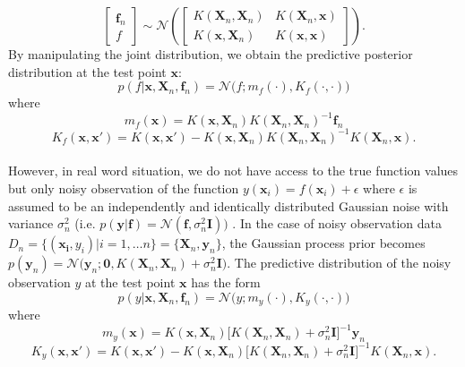 \documentclass[a4paper,11pt]{report}
\begin{document}
\begin{equation}
	\begin{bmatrix}
  		 \mathbf{f}_n\\ 
   		f
	  \end{bmatrix}
		\sim\mathcal{N} \left ( 
 		\begin{bmatrix}
   		K(\mathbf{X}_n,\mathbf{X}_n) & K(\mathbf{X}_n,\mathbf{x}) \\
   		K( \mathbf{x}, \mathbf{X}_n) & K( \mathbf{x}, \mathbf{x})
 	\end{bmatrix} \right ).
 \end{equation} 
By manipulating the joint distribution, we obtain the predictive posterior distribution at the test point $\mathbf{x}$:
\begin{equation} \label{posteriorf}
	p(f \vert \mathbf{x},\mathbf{X}_n, \mathbf{f}_n) = \mathcal{N}\big( f ; m_{f}(\cdot), K_{f}(\cdot, \cdot) \big)
\end{equation}
where 
\begin{equation} 
	m_{f}(\mathbf{x})=K(\mathbf{x}, \mathbf{X}_n) K(\mathbf{X}_n,\mathbf{X}_n)^{-1} \mathbf{f}_n 
\end{equation}
\begin{equation} \label{covarianceofposter}
	K_{f}(\mathbf{x},\mathbf{x}')=  K(\mathbf{x},\mathbf{x}') - K( \mathbf{x},\mathbf{X}_n ) K(\mathbf{X}_n,\mathbf{X}_n)^{-1} K(\mathbf{X}_n,\mathbf{x}).
\end{equation} 
\\
However, in real word situation, we do not have access to the true function values but only noisy observation of the function $ y(\mathbf{x}_i) = f(\mathbf{x}_i) +  \epsilon $ where $\epsilon$ is assumed to be an independently and identically distributed Gaussian noise with variance $\sigma_n^2$ \big(i.e. $p(\mathbf{y} \vert \mathbf{f}) = \mathcal{N} ( \mathbf{f}, \sigma_n^2 \mathbf{I}) \big)$ \cite{rasmussen2006gaussian}.  In the case of noisy observation data $D_n=\{(\mathbf{x_{i}},y_{i}) \vert i=1, \dots n\}=\{ \mathbf{X}_n,\mathbf{y}_n\}$, the Gaussian process prior becomes $p (\mathbf{y}_n)= \mathcal{N}\big(\mathbf{y}_n; \mathbf{0},K( \mathbf{X}_n,\mathbf{X}_n)+\sigma_n^2 \mathbf{I} \big)$. The predictive distribution of the noisy observation $y$ at the test point $\mathbf{x}$ has the form
 	\begin{equation} \label{posteriory}
	p(y \vert \mathbf{x},\mathbf{X}_n, \mathbf{f}_n) =\mathcal{N} \big( y ; m_{y}(\cdot), K_{y}(\cdot, \cdot) \big)
 	\end{equation}
where 
\begin{equation} 
	m_{y}(\mathbf{x})=K(\mathbf{x}, \mathbf{X}_n) \big[ K(\mathbf{X}_n,\mathbf{X}_n) +\sigma_n^2 \mathbf{I} \big]^{-1} \mathbf{y}_n 
\end{equation}
\begin{equation} 
	K_{y}(\mathbf{x},\mathbf{x}')=  K(\mathbf{x},\mathbf{x}') - K(\mathbf{x}, \mathbf{X}_n)\big[ K(\mathbf{X}_n,\mathbf{X}_n)+\sigma_n^2 \mathbf{I} \big]^{-1} K(\mathbf{X}_n,\mathbf{x}).
\end{equation}
\end{document}
